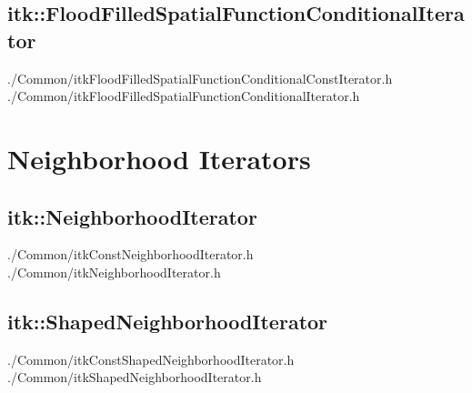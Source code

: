 \subsection{itk::FloodFilledSpatialFunctionConditionalIterator}
\label{itk::FloodFilledSpatialFunctionConditionalIterator}
./Common/itkFloodFilledSpatialFunctionConditionalConstIterator.h
./Common/itkFloodFilledSpatialFunctionConditionalIterator.h


\section{Neighborhood Iterators}
\label{sec:NeighborhoodIterators}




\subsection{itk::NeighborhoodIterator}
\label{sec:itkNeighborhoodIterator}
./Common/itkConstNeighborhoodIterator.h
./Common/itkNeighborhoodIterator.h

\subsection{itk::ShapedNeighborhoodIterator}
\label{sec:itkShapedNeighborhoodIterator}
./Common/itkConstShapedNeighborhoodIterator.h
./Common/itkShapedNeighborhoodIterator.h






















